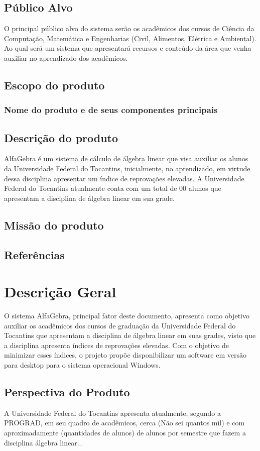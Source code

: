 \documentclass{scrreprt}
\begin{document}
\section{Público Alvo}
O principal público alvo do sistema serão os acadêmicos dos cursos de Ciência da Computação, Matemática e Engenharias (Civil, Alimentos, Elétrica e Ambiental). Ao qual será um sistema que apresentará recursos e conteúdo da área que venha auxiliar no aprendizado dos acadêmicos.

\section{Escopo do produto}
\subsection{Nome do produto e de seus componentes principais}


\section{Descrição do produto}
AlfaGebra é um sistema de cálculo de álgebra linear que visa auxiliar os alunos da Universidade Federal do Tocantins, inicialmente, no aprendizado, em virtude dessa disciplina apresentar um índice de reprovações elevadas. A Universidade Federal do Tocantins atualmente conta com um total de 00 alunos que apresentam a disciplina de álgebra linear em sua grade.
\section{Missão do produto}
\section{Referências}


\chapter{Descrição Geral}
O sistema AlfaGebra, principal fator deste documento, apresenta como objetivo auxiliar os acadêmicos dos cursos de graduação da Universidade Federal do Tocantins que apresentam a disciplina de álgebra linear em suas grades, visto que a disciplina apresenta índices de reprovações elevadas. Com o objetivo de minimizar esses índices, o projeto propõe disponibilizar um software em versão para desktop para o sistema operacional Windows.

\section{Perspectiva do Produto}
A Universidade Federal do Tocantins apresenta atualmente, segundo a PROGRAD, em seu quadro de acadêmicos, cerca (Não sei quantos mil) e com aproximadamente (quantidades de alunos) de alunos por semestre que fazem a disciplina álgebra linear...
\end{document}
